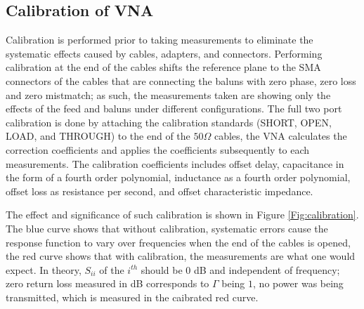 \documentclass[preprint]{aastex}  %
\begin{document}
\subsection{Calibration of VNA}
Calibration is performed prior to taking measurements to eliminate the systematic effects caused by cables, adapters, and connectors. Performing calibration at the end of the cables shifts the reference plane to the SMA connectors of the cables that are connecting the baluns with zero phase, zero loss and zero mistmatch; as such, the measurements taken are showing only the effects of the feed and baluns under different configurations. The full two port calibration is done by attaching the calibration standards (SHORT, OPEN, LOAD, and THROUGH) to the end of the $50\Omega$ cables, the VNA calculates the correction coefficients and applies the coefficients subsequently to each measurements. The calibration coefficients includes offset delay, capacitance in the form of a fourth order polynomial, inductance as a fourth order polynomial, offset loss as resistance per second, and offset characteristic impedance. 

The effect and significance of such calibration is shown in Figure \ref{Fig:calibration}. The blue 
curve shows that without calibration, systematic errors 
cause the response function to vary over frequencies when the end of the cables 
is opened, the red curve shows that with calibration, the 
measurements are what one would expect. In theory, $S_{ii}$ of the $i^{th}$ should be $0$ dB and independent of frequency; zero return loss measured in dB corresponds to $\Gamma$ being $1$, no power was being transmitted, which is measured in the caibrated red curve. 
\end{document}

